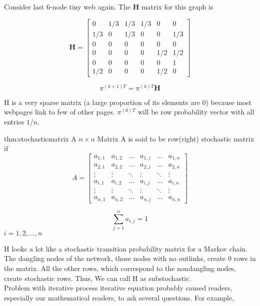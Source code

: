 \noindent Consider last 6-node tiny web again. The $\mathbf{H}$ matrix for this graph is

$$
\mathbf{H}=\left[\begin{array}{cccccc}
	0 & 1 / 3 & 1 / 3 & 1 / 3 & 0 & 0 \\
	1 / 3 & 0 & 1 / 3 & 0 & 0 & 1 / 3 \\
	0 & 0 & 0 & 0 & 0 & 0 \\
	0 & 0 & 0 & 0 & 1 / 2 & 1 / 2 \\
	0 & 0 & 0 & 0 & 0 & 1 \\
	1 / 2 & 0 & 0 & 0 & 1 / 2 & 0
\end{array}\right]
$$

$${\pi}^{(k+1) T}={\pi}^{(k) T} \mathbf{H}$$

\noindent H is a very sparse matrix (a large proportion of its elements are 0) because most webpages link to few of other pages. ${\pi}^{(0)T}$ will be row probability vector with all entries $1/n$.

\begin{thm}{thm:stochasticmatrix}
A $n\times n$ Matrix A is said to be row(right) stochastic matrix if
$$
A=\left[\begin{array}{cccccc}
	a_{1,1} & a_{1,2} & \ldots & a_{1, j} & \ldots & a_{1, n} \\
	a_{2,1} & a_{2,2} & \ldots & a_{2, j} & \ldots & a_{2, n} \\
	\vdots & \vdots & \ddots & \vdots & \ddots & \vdots \\
	a_{i, 1} & a_{i, 2} & \ldots & a_{i, j} & \ldots & a_{i, n} \\
	\vdots & \vdots & \ddots & \vdots & \ddots & \vdots \\
	a_{n, 1} & a_{n, 2} & \ldots & a_{n, j} & \ldots & a_{n, n}
    \end{array}\right]
$$

$$\sum_{j=1}^{n} a_{i, j}=1$$  \centering $i = 1, 2, ..., n$
\end{thm}

\noindent H looks a lot like a stochastic transition probability matrix for a Markov chain.
The dangling nodes of the network, those nodes with no outlinks, create 0 rows in
the matrix. All the other rows, which correspond to the nondangling nodes, create
stochastic rows. Thus, We can call H as substochastic.\\

\noindent Problem with iterative process iterative equation probably caused readers, especially our mathematical readers, to ask several questions. For example,

